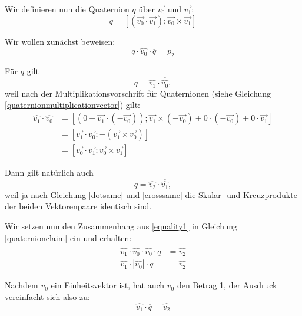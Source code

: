 Wir definieren nun die Quaternion $q$ über $\vec{v_0}$ und $\vec{v_1}$:
\begin{equation}
 q = \left[ \left( \vec{v_0} \cdot \vec{v_1} \right); \vec{v_0} \times \vec{v_1} \right]
\end{equation} 

Wir wollen zunächst beweisen:
\begin{equation}
 \label{quaternionclaim}
 q \cdot \hat{v_0} \cdot \overline{q} = p_2
\end{equation} 

Für $q$ gilt
\begin{equation}
 \label{equality1}
 q = \hat{v_1} \cdot \overline{\hat{v_0}},
\end{equation}
weil nach der Multiplikationsvorschrift für Quaternionen (siehe Gleichung \ref{quaternionmultiplicationvector}) gilt:
\begin{equation}
\begin{split}
 \hat{v_1} \cdot \overline{\hat{v_0}} &= \left[ \left( 0 - \vec{v_1} \cdot (-\vec{v_0}) \right); \vec{v_1} \times (-\vec{v_0}) + 0 \cdot (-\vec{v_0}) + 0 \cdot \vec{v_1} \right] \\
 &= \left[ \vec{v_1} \cdot \vec{v_0}; -( \vec{v_1} \times \vec{v_0}) \right] \\
 &= \left[ \vec{v_0} \cdot \vec{v_1}; \vec{v_0} \times \vec{v_1} \right]
\end{split}
\end{equation} 

Dann gilt natürlich auch
\begin{equation}
 \label{equality2}
 q = \hat{v_2} \cdot \overline{\hat{v_1}},
\end{equation} 
weil ja nach Gleichung \ref{dotsame} und \ref{crosssame} die Skalar- und Kreuzprodukte der beiden Vektorenpaare identisch sind.

Wir setzen nun den Zusammenhang aus \ref{equality1} in Gleichung \ref{quaternionclaim} ein und erhalten:
\begin{equation}
\begin{split}
 \label{step1}
 \hat{v_1} \cdot \overline{\hat{v_0}} \cdot \hat{v_0} \cdot \overline{q} &= \hat{v_2} \\
 \hat{v_1} \cdot \left| \hat{v_0} \right| \cdot \overline{q} &= \hat{v_2}
\end{split}
\end{equation}

Nachdem $v_0$ ein Einheitsvektor ist, hat auch $\hat{v_0}$ den Betrag 1, der Ausdruck vereinfacht sich also zu:
\begin{equation}
 \hat{v_1} \cdot \overline{q} = \hat{v_2}
\end{equation}

